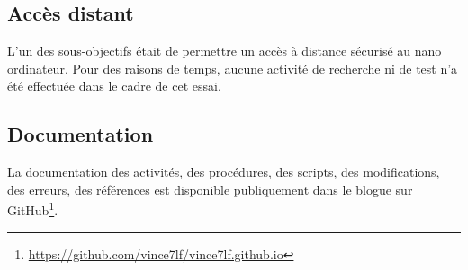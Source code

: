 \subsection{Accès distant}
\noindent L'un des sous-objectifs était de permettre un accès à distance sécurisé au nano ordinateur. Pour des raisons de temps, aucune activité de recherche ni de test n'a été effectuée dans le cadre de cet essai. 
\subsection{Documentation}
\noindent La documentation des activités, des procédures, des scripts, des modifications, des erreurs, des références est disponible publiquement dans le blogue sur GitHub\footnote{\url{https://github.com/vince7lf/vince7lf.github.io}}.